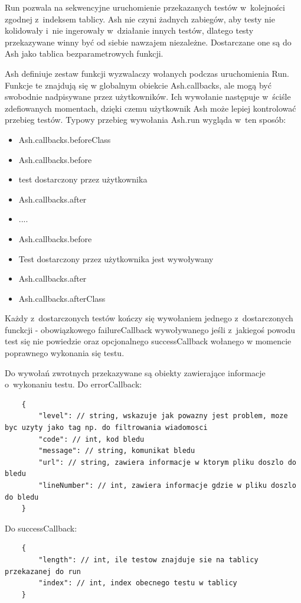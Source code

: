 \documentclass[brudnopis]{xmgr}
\begin{document}
Run pozwala na sekwencyjne uruchomienie przekazanych testów w~kolejności zgodnej z~indeksem tablicy. Ash nie czyni żadnych zabiegów, aby testy nie kolidowały i~nie ingerowały w~działanie innych testów, dlatego testy przekazywane winny być od siebie nawzajem niezależne. Dostarczane one są do Ash jako tablica bezparametrowych funkcji.

Ash definiuje zestaw funkcji wyzwalaczy wołanych podczas uruchomienia Run. Funkcje te znajdują się w globalnym obiekcie Ash.callbacks, ale mogą być swobodnie nadpisywane przez użytkowników. Ich wywołanie następuje w~ściśle zdefiowanych momentach, dzięki czemu użytkownik Ash może lepiej kontrolować przebieg testów. Typowy przebieg wywołania Ash.run wygląda w~ten sposób:

\begin{itemize}
  \item Ash.callbacks.beforeClass
  \item Ash.callbacks.before
  \item {test dostarczony przez użytkownika}
  \item Ash.callbacks.after
  \item ....
  \item Ash.callbacks.before
  \item Test dostarczony przez użytkownika jest wywoływany
  \item Ash.callbacks.after
  \item Ash.callbacks.afterClass
\end{itemize}

Każdy z~dostarczonych testów kończy się wywołaniem jednego z~dostarczonych funckcji - obowiązkowego failureCallback wywoływanego jeśli z~jakiegoś powodu test się nie powiedzie oraz opcjonalnego successCallback wołanego w momencie poprawnego wykonania się testu.

Do wywołań zwrotnych przekazywane są obiekty zawierające informacje o~wykonaniu testu. Do errorCallback:

\begin{lstlisting}
	{
		"level": // string, wskazuje jak powazny jest problem, moze byc uzyty jako tag np. do filtrowania wiadomosci
		"code": // int, kod bledu
		"message": // string, komunikat bledu 
		"url": // string, zawiera informacje w ktorym pliku doszlo do bledu 
		"lineNumber": // int, zawiera informacje gdzie w pliku doszlo do bledu
	}
\end{lstlisting}

Do successCallback: 

\begin{lstlisting}
	{
		"length": // int, ile testow znajduje sie na tablicy przekazanej do run 
		"index": // int, index obecnego testu w tablicy 
	}
\end{lstlisting}
\end{document}
